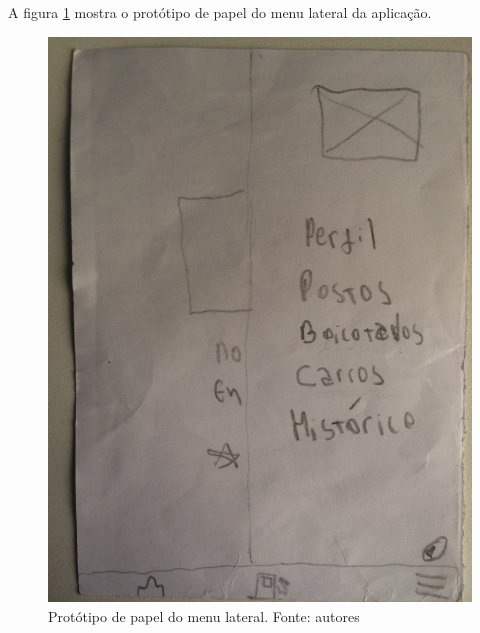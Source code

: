 A figura \ref{img:prototipo_de_papel_menu_lateral} mostra o protótipo de papel do menu lateral da aplicação.
\begin{figure}[H]
    \centering
    \includegraphics[scale=0.1, angle=-90]{figuras/prototipo_papel_menu.jpg}
    \caption[Protótipo de papel do menu lateral]{Protótipo de papel do menu lateral. Fonte: autores}
    \label{img:prototipo_de_papel_menu_lateral}
\end{figure}
 \pagebreak

